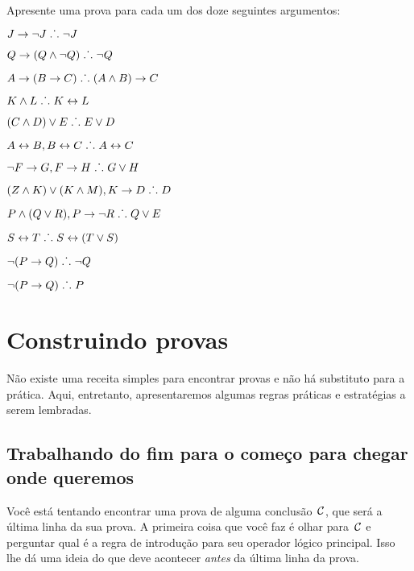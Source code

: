 \solutions
\problempart
\label{pr.solvedTFLproofs}
Apresente uma prova para cada um dos doze seguintes argumentos:
\begin{earg}
\item $J\rightarrow\neg J \mathrel{\ldotp\dot{}\,\ldotp} \neg J$
\item $Q\rightarrow(Q\wedge\neg Q) \mathrel{\ldotp\dot{}\,\ldotp} \neg Q$
\item $A\rightarrow (B\rightarrow C) \mathrel{\ldotp\dot{}\,\ldotp} (A\wedge B)\rightarrow C$
\item $K\wedge L \mathrel{\ldotp\dot{}\,\ldotp} K\leftrightarrow L$
\item $(C\wedge D)\vee E \mathrel{\ldotp\dot{}\,\ldotp} E\vee D$
\item $A\leftrightarrow B, B\leftrightarrow C \mathrel{\ldotp\dot{}\,\ldotp} A\leftrightarrow C$
\item $\neg F\rightarrow G, F\rightarrow H \mathrel{\ldotp\dot{}\,\ldotp} G\vee H$
\item $(Z\wedge K) \vee (K\wedge M), K \rightarrow D \mathrel{\ldotp\dot{}\,\ldotp} D$
\item $P \wedge (Q\vee R), P\rightarrow \neg R \mathrel{\ldotp\dot{}\,\ldotp} Q\vee E$
\item $S\leftrightarrow T \mathrel{\ldotp\dot{}\,\ldotp} S\leftrightarrow (T\vee S)$
\item $\neg (P \rightarrow Q) \mathrel{\ldotp\dot{}\,\ldotp} \neg Q$
\item $\neg (P \rightarrow Q) \mathrel{\ldotp\dot{}\,\ldotp} P$
\end{earg}


\chapter{Construindo provas}\label{s:stratTFL}

 Não existe uma receita simples para encontrar provas e não há substituto para a prática. Aqui, entretanto, apresentaremos algumas regras práticas e estratégias a serem lembradas.

\section{Trabalhando do fim para o começo para chegar onde queremos}

 Você está tentando encontrar uma prova de alguma conclusão~$\mathcal{C}$, que será a última linha da sua prova. A primeira coisa que você faz é olhar para~$\mathcal{C}$ e perguntar qual é a regra de introdução para seu operador lógico principal. Isso lhe dá uma ideia do que deve acontecer \emph{antes} da última linha da prova. 


